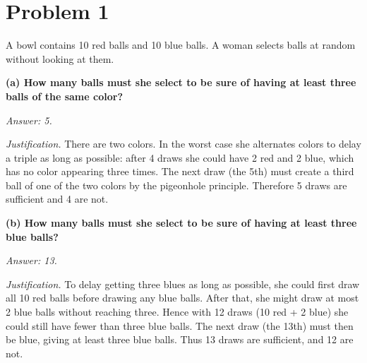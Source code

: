 \section*{Problem 1}
A bowl contains 10 red balls and 10 blue balls. A woman selects balls at random without looking at them.

\textbf{(a) How many balls must she select to be sure of having at least three balls of the same color?}

\emph{Answer: 5.}

\emph{Justification.} There are two colors. In the worst case she alternates colors to delay a triple as long as possible: after 4 draws she could have 2 red and 2 blue, which has no color appearing three times. The next draw (the 5th) must create a third ball of one of the two colors by the pigeonhole principle. Therefore 5 draws are sufficient and 4 are not.

\textbf{(b) How many balls must she select to be sure of having at least three blue balls?}

\emph{Answer: 13.}

\emph{Justification.} To delay getting three blues as long as possible, she could first draw all 10 red balls before drawing any blue balls. After that, she might draw at most 2 blue balls without reaching three. Hence with 12 draws (10 red + 2 blue) she could still have fewer than three blue balls. The next draw (the 13th) must then be blue, giving at least three blue balls. Thus 13 draws are sufficient, and 12 are not.
